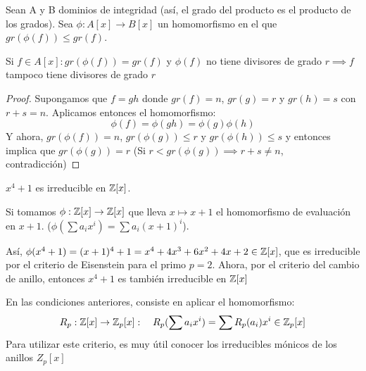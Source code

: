 \begin{nprop}
	Sean A y B dominios de integridad (así, el grado del producto es el producto de los grados). Sea $\phi : A[x] \to B[x]$ un homomorfismo en el que $gr(\phi(f))  \leq gr(f)$.

	Si $f\in A[x] : gr(\phi(f))= gr(f)$ y $\phi(f)$ no tiene divisores de grado $r \implies f$ tampoco tiene divisores de grado $r$
\end{nprop}
\begin{proof}
	Supongamos que $f=gh$ donde $gr(f) = n$, $gr(g) = r$ y $gr(h) = s$ con $r+s = n$.
	Aplicamos entonces el homomorfismo:
	\[
	\phi(f) = \phi(gh) = \phi(g)\phi(h)
	\]
	Y ahora, $gr(\phi(f)) = n$, $gr(\phi(g)) \leq r$ y $gr(\phi(h)) \leq s$ y entonces implica que $gr(\phi(g)) = r$ (Si $r < gr(\phi(g)) \implies r+s \neq n$, contradicción)
\end{proof}
\begin{ejemplo}
	$x^4+1$ es irreducible en $\mathbb{Z}[x]$.

	Si tomamos $\phi:\mathbb{Z}[x] \to \mathbb{Z}[x]$ que lleva $x \mapsto x+1$ el homomorfismo de evaluación en $x+1$. ($\phi(\sum a_i x^i) = \sum a_i (x+1)^i$).

	Así, $\phi(x^4+1) = (x+1)^4+1 = x^4 +4x^3 +6x^2 +4x + 2 \in \mathbb{Z}[x]$, que es irreducible por el criterio de Eisenstein para el primo $p=2$. Ahora, por el criterio del cambio de anillo, entonces $x^4+1$ es también irreducible en $\mathbb{Z}[x]$
\end{ejemplo}

\begin{nprop}
	En las condiciones anteriores, consiste en aplicar el homomorfismo:
	\[
	R_p:\mathbb{Z}[x] \to \mathbb{Z}_p[x] : \quad R_p(\sum a_i x^i) =  \sum R_p(a_i) x^i \in \mathbb{Z}_p[x]
	\]
	Para utilizar este criterio, es muy útil conocer los irreducibles mónicos de los anillos $Z_p[x]$
\end{nprop}

